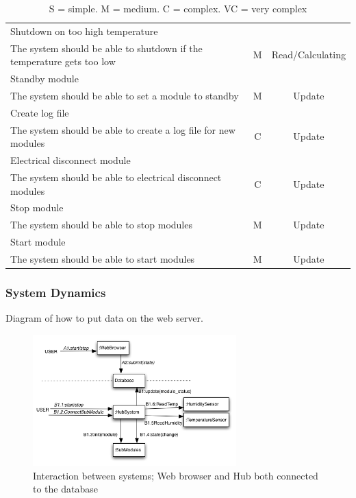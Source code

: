 \begin{table}[H]
\begin{tabular}{| l | c | c |}
	Shutdown on too high temperature	&&
	\\The system should be able to shutdown if the temperature gets too low			& M				& Read/Calculating 	\\ \hline
	Standby module	&&
	\\The system should be able to set a module to standby						& M				& Update 			\\ \hline
	Create log file	&&
	\\The system should be able to create a log file for new modules				& C				& Update 			\\ \hline
	Electrical disconnect module	&&
	\\The system should be able to electrical disconnect modules					& C				& Update 			\\ \hline
	Stop module	&&
	\\The system should be able to stop modules								& M				& Update	 		\\ \hline
	Start module	&&
	\\The system should be able to start modules								& M				& Update		 	\\ \hline
				\end{tabular}
				\caption{S = simple. M = medium. C = complex. VC = very complex}
			\end{table}
	\subsubsection{System Dynamics}
			Diagram of how to put data on the web server.
			\begin{figure}[H]		%
			\begin{centering}
				 \includegraphics[width=0.7\textwidth]{images/communication_diagram.png}
				\caption{Interaction between systems; Web browser and Hub both connected to the database}
		 	\end{centering}
		\end{figure}		
